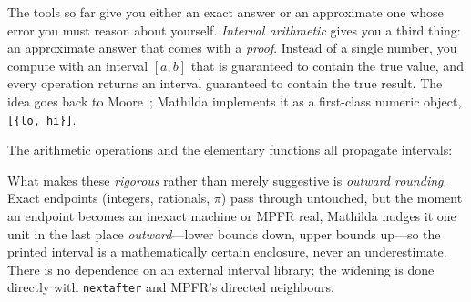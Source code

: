 The tools so far give you either an exact answer or an approximate one whose error you
must reason about yourself. \emph{Interval arithmetic} gives you a third thing: an
approximate answer that comes with a \emph{proof}. Instead of a single number, you
compute with an interval $[a,b]$ that is guaranteed to contain the true value, and every
operation returns an interval guaranteed to contain the true result. The idea goes back
to Moore~\cite{moore2009}; Mathilda implements it as a first-class numeric object,
\texttt{[\{lo, hi\}]}.

The arithmetic operations and the elementary functions all propagate intervals:

\begin{codepairs}
\end{codepairs}

What makes these \emph{rigorous} rather than merely suggestive is \emph{outward
rounding}. Exact endpoints (integers, rationals, $\pi$) pass through untouched, but the
moment an endpoint becomes an inexact machine or MPFR real, Mathilda nudges it one unit
in the last place \emph{outward}---lower bounds down, upper bounds up---so the printed
interval is a mathematically certain enclosure, never an underestimate. There is no
dependence on an external interval library; the widening is done directly with
\texttt{nextafter} and MPFR's directed neighbours.


